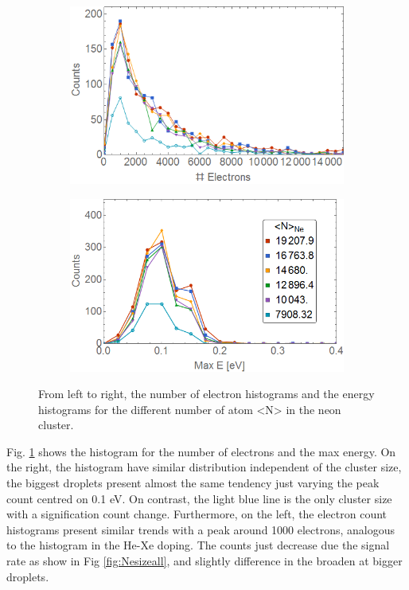 \begin{figure}[h!]
\hfill
\begin{subfigure}[l]{0.48\textwidth}
\includegraphics[width=1\textwidth]{../Images/results/MIR_Ne_DropletSize/HElec.png} 
\end{subfigure} 
\begin{subfigure}[l]{0.48\textwidth}
\includegraphics[width=1\textwidth]{../Images/results/MIR_Ne_DropletSize/HEnergc.png} 
\end{subfigure} \hfill
\caption[MIR Ne size dependence.Histograms]{From left to right, the number of electron histograms and the energy histograms for the different  number of atom <N> in the neon cluster. }
\label{fig:NeonsizeHisto}
\end{figure}

Fig. \ref{fig:NeonsizeHisto} shows the histogram for the number of electrons  and the max energy. On the right, the histogram have similar distribution independent of the cluster size, the biggest droplets present almost the same tendency just varying the peak count centred on 0.1 eV. On contrast, the light blue line is the only cluster size with a signification count change. Furthermore, on the left, the electron count histograms present similar trends with a peak around 1000 electrons, analogous to the histogram in the He-Xe doping. The counts just decrease due the signal rate as show in Fig \ref{fig:Nesizeall}, and slightly difference in the broaden at  bigger droplets. 

